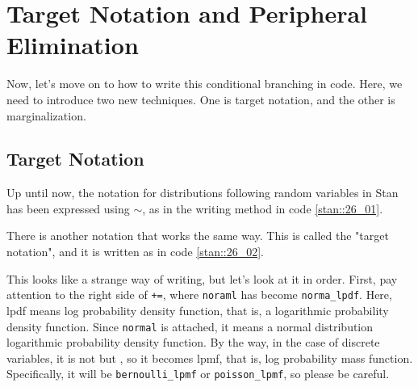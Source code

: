 \documentclass{ltjsbook}
\begin{document}
\section{Target Notation and Peripheral Elimination}
Now, let's move on to how to write this conditional branching in code. Here, we need to introduce two new techniques. One is target notation, and the other is marginalization.
\subsection{Target Notation}
Up until now, the notation for distributions following random variables in Stan has been expressed using $\sim$, as in the writing method in code \ref{stan::26_01}.

There is another notation that works the same way. This is called the "target notation", and it is written as in code \ref{stan::26_02}.


This looks like a strange way of writing, but let's look at it in order. First, pay attention to the right side of \verb|+=|, where \verb|noraml| has become \verb|norma_lpdf|. Here, lpdf means log probability density function, that is, a logarithmic probability density function. Since \verb|normal| is attached, it means a normal distribution logarithmic probability density function. By the way, in the case of discrete variables, it is not  but , so it becomes lpmf, that is, log probability mass function. Specifically, it will be \verb|bernoulli_lpmf| or \verb|poisson_lpmf|, so please be careful.
\end{document}
